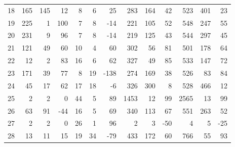 \begin{table}[ht]
\begin{tabular}{lrrrrrrrrrrrr}
18 & 165 & 145 & 12 & 8 & 6 & 25 & 283 & 164 & 42 & 523 & 401 & 23 \\
19 & 225 & 1 & 100 & 7 & 8 & -14 & 221 & 105 & 52 & 548 & 247 & 55 \\
20 & 231 & 9 & 96 & 7 & 8 & -14 & 219 & 125 & 43 & 544 & 297 & 45 \\
21 & 121 & 49 & 60 & 10 & 4 & 60 & 302 & 56 & 81 & 501 & 178 & 64 \\
22 & 12 & 2 & 83 & 16 & 6 & 62 & 327 & 49 & 85 & 533 & 147 & 72 \\
23 & 171 & 39 & 77 & 8 & 19 & -138 & 274 & 169 & 38 & 526 & 83 & 84 \\
24 & 45 & 17 & 62 & 17 & 18 & -6 & 326 & 300 & 8 & 528 & 466 & 12 \\
25 & 2 & 2 & 0 & 44 & 5 & 89 & 1453 & 12 & 99 & 2565 & 13 & 99 \\
26 & 63 & 91 & -44 & 16 & 5 & 69 & 340 & 113 & 67 & 551 & 263 & 52 \\
27 & 2 & 2 & 0 & 26 & 1 & 96 & 2 & 3 & -50 & 4 & 5 & -25 \\
28 & 13 & 11 & 15 & 19 & 34 & -79 & 433 & 172 & 60 & 766 & 55 & 93 \\
\bottomrule
\end{tabular}
\end{table}
